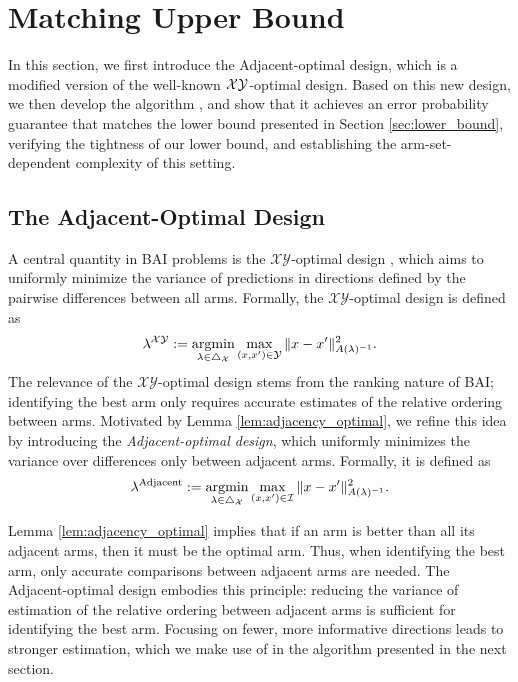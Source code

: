 \section{Matching Upper Bound}
\label{sec:algorithm}

In this section, we first introduce the Adjacent-optimal design, which is a modified version of the well-known $\mathcal{XY}$-optimal design. Based on this new design, we then develop the algorithm \algoname, and show that it achieves an error probability guarantee that matches the lower bound presented in Section \ref{sec:lower_bound}, verifying the tightness of our lower bound, and establishing the arm-set-dependent complexity of this setting.

\subsection{The Adjacent-Optimal Design}

A central quantity in BAI problems is the $\mathcal{XY}$-optimal design \citep{soare2014best}, which aims to uniformly minimize the variance of predictions in directions defined by the pairwise differences between all arms. Formally, the $\mathcal{XY}$-optimal design is defined as
\begin{equation}\label{eq:xy-optimal}
    \lambda^{\mathcal{XY}} := \operatorname*{argmin}_{\lambda \in \triangle_{\mathcal{X}}} \max_{(x, x') \in \mathcal{Y}}\|x-x'\|^2_{A(\lambda)^{-1}}.\end{equation}
The relevance of the $\mathcal{XY}$-optimal design stems from the ranking nature of BAI; identifying the best arm only requires accurate estimates of the relative ordering between arms. Motivated by Lemma \ref{lem:adjacency_optimal}, we refine this idea by introducing the \textit{Adjacent-optimal design}, which uniformly minimizes the variance over differences only between adjacent arms. Formally, it is defined as
\begin{equation}\label{eq:adjacent-optimal}\lambda^{\mathrm{Adjacent}}:= \operatorname*{argmin}_{\lambda \in \triangle_{\mathcal{X}}} \max_{(x, x') \in \mathcal{I}}\|x-x'\|^2_{A(\lambda)^{-1}}.\end{equation}

Lemma \ref{lem:adjacency_optimal} implies that if an arm is better than all its adjacent arms, then it must be the optimal arm. Thus, when identifying the best arm, only accurate comparisons between adjacent arms are needed. The Adjacent-optimal design embodies this principle: reducing the variance of estimation of the relative ordering between adjacent arms is sufficient for identifying the best arm. Focusing on fewer, more informative directions leads to stronger estimation, which we make use of in the algorithm presented in the next section.


